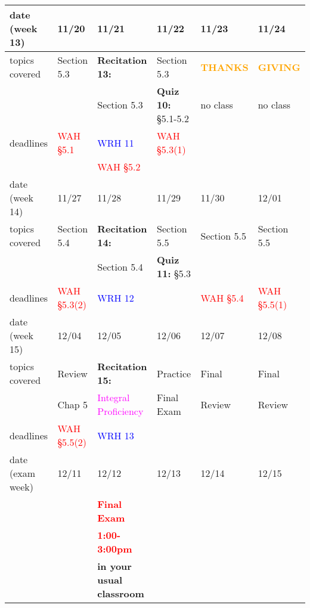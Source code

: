 \documentclass[11pt,fleqn]{article}
\begin{document}
\begin{tabularx}{\textwidth}{|X|| X | X | X | X | X |}
\hline
\rowcolor{gray!20}
date (week 13)&11/20&11/21&11/22&11/23&11/24\\ \hline
topics covered&Section 5.3&\textbf{Recitation 13:}&Section 5.3&\textbf{\textcolor{orange}{THANKS}}&\textbf{\textcolor{orange}{GIVING}}\\ 
&&Section 5.3&\textbf{Quiz 10:} \S5.1-5.2&no class&no class\\ \hline
deadlines&\textcolor{red}{WAH \S 5.1}&\textcolor{blue}{WRH 11} &\textcolor{red}{WAH \S 5.3(1)}&& \\ 
&&\textcolor{red}{WAH \S 5.2}&&&\\ \hline \hline
\rowcolor{gray!20}
date (week 14)&11/27&11/28&11/29&11/30&12/01\\ \hline
topics covered&Section 5.4&\textbf{Recitation 14:}&Section 5.5&Section 5.5&Section 5.5\\ 
&&Section 5.4&\textbf{Quiz 11:} \S5.3&&\\ \hline
deadlines&\textcolor{red}{WAH \S 5.3(2)}&\textcolor{blue}{WRH 12} &&\textcolor{red}{WAH \S 5.4}&\textcolor{red}{WAH \S 5.5(1)} \\ \hline \hline
\rowcolor{gray!20}
date (week 15)&12/04&12/05&12/06&12/07&12/08\\ \hline
topics covered&Review&\textbf{Recitation 15:}&Practice &Final&Final\\ 
&Chap 5&\textcolor{magenta}{Integral Proficiency}&Final Exam&Review&Review\\ 
\hline
deadlines&\textcolor{red}{WAH \S 5.5(2)}&\textcolor{blue}{WRH 13}&&& \\ \hline \hline
\rowcolor{gray!20}
date (exam week)&12/11&12/12&12/13&12/14&12/15\\ \hline
&&\textcolor{red}{\textbf{Final Exam}}&&&\\ 
&&\textcolor{red}{\textbf{1:00-3:00pm}}&&&\\ \hline
&&{\textbf{in your usual classroom}}&&&\\ \hline
 \hline
\end{tabularx}
\end{document}
